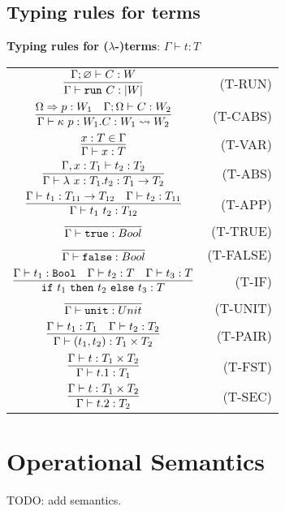 \documentclass[12pt]{article}
\begin{document}
\subsection{Typing rules for terms}
\noindent \textbf{Typing rules for ($\lambda$-)terms}: $\boxed{\Gamma\vdash t:T}$

\renewcommand\arraystretch{3}
\begin{longtable}[c]{cr}
  $\infer{\Gamma\vdash \trun\ C : |W| }{\Gamma;\varnothing \vdash C:W}$ &(T-RUN)\\
  $\infer{\Gamma\vdash \kappa\ p:W_1 . C: W_1\leadsto W_2 }{\Omega\To p:W_1 &\Gamma;\Omega\vdash C:W_2}$ &(T-CABS)\\
  $\infer{\Gamma\vdash x:T}{x:T\in \Gamma}$ &(T-VAR)\\
  $\infer{\Gamma\vdash \lambda\ x:T_1.t_2 : T_1\to T_2}{\Gamma,x:T_1 \vdash t_2:T_2}$ &(T-ABS)\\
  $\infer{\Gamma\vdash t_1\ t_2 : T_{12}}{\Gamma\vdash t_1:T_{11}\to T_{12} & \Gamma\vdash t_2:T_{11}}$ &(T-APP)\\
  $\infer{\Gamma\vdash\true : Bool}{}$ &(T-TRUE)\\
  $\infer{\Gamma\vdash\false : Bool}{}$ &(T-FALSE)\\
  $\infer{\tif\ t_1\ \tthen\ t_2\ \telse\ t_3 : T}{\Gamma\vdash t_1:\Bool &\Gamma\vdash t_2:T &\Gamma\vdash t_3:T}$ &(T-IF)\\
  $\infer{\Gamma\vdash\unit : Unit}{}$ &(T-UNIT)\\
  $\infer{\Gamma\vdash (t_1,t_2) : T_1\times T_2}{\Gamma\vdash t_1:T_1 &\Gamma\vdash t_2:T_2}$ &(T-PAIR)\\
  $\infer{\Gamma\vdash t.1 : T_1}{\Gamma\vdash t : T_1\times T_2}$ &(T-FST)\\
  $\infer{\Gamma\vdash t.2 : T_2}{\Gamma\vdash t : T_1\times T_2}$ &(T-SEC)\\
\end{longtable}


\section{Operational Semantics}
{\color{red} TODO: add semantics.}
\end{document}

